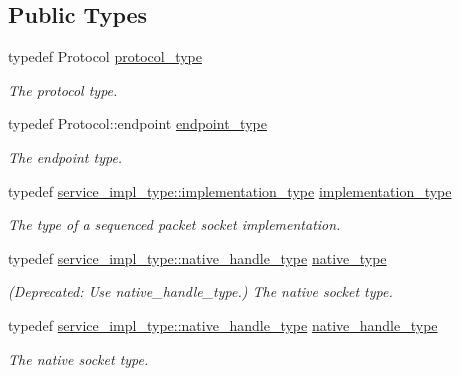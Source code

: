 \subsection*{Public Types}
\begin{DoxyCompactItemize}
\item 
typedef Protocol \hyperlink{classasio_1_1seq__packet__socket__service_a34f0604b58ba016dc75d31f86d291458}{protocol\+\_\+type}
\begin{DoxyCompactList}\small\item\em The protocol type. \end{DoxyCompactList}\item 
typedef Protocol\+::endpoint \hyperlink{classasio_1_1seq__packet__socket__service_ade8f7b83e2a45da7bbdc473deaf25075}{endpoint\+\_\+type}
\begin{DoxyCompactList}\small\item\em The endpoint type. \end{DoxyCompactList}\item 
typedef \hyperlink{structasio_1_1detail_1_1reactive__socket__service_1_1implementation__type}{service\+\_\+impl\+\_\+type\+::implementation\+\_\+type} \hyperlink{classasio_1_1seq__packet__socket__service_a6e1d2027450d7a5d8ea7896a3de0c8ff}{implementation\+\_\+type}
\begin{DoxyCompactList}\small\item\em The type of a sequenced packet socket implementation. \end{DoxyCompactList}\item 
typedef \hyperlink{classasio_1_1detail_1_1reactive__socket__service_a2fc869359f3eb7b6f25925f10e594e1d}{service\+\_\+impl\+\_\+type\+::native\+\_\+handle\+\_\+type} \hyperlink{classasio_1_1seq__packet__socket__service_a50a688faafd55ee40b087c28b398efc2}{native\+\_\+type}
\begin{DoxyCompactList}\small\item\em (Deprecated\+: Use native\+\_\+handle\+\_\+type.) The native socket type. \end{DoxyCompactList}\item 
typedef \hyperlink{classasio_1_1detail_1_1reactive__socket__service_a2fc869359f3eb7b6f25925f10e594e1d}{service\+\_\+impl\+\_\+type\+::native\+\_\+handle\+\_\+type} \hyperlink{classasio_1_1seq__packet__socket__service_a80d5af14e0e6580995b0a64de71f6f9a}{native\+\_\+handle\+\_\+type}
\begin{DoxyCompactList}\small\item\em The native socket type. \end{DoxyCompactList}\end{DoxyCompactItemize}

